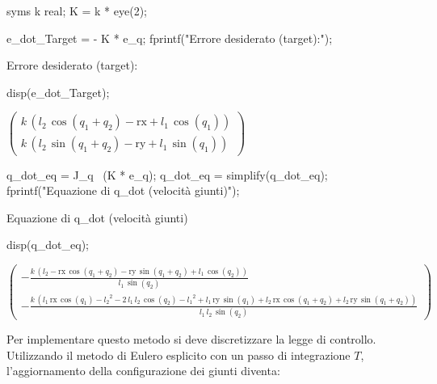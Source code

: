 \documentclass[11pt, a4paper]{article}
\begin{document}
\begin{matlabcode}
syms k real;
K = k * eye(2);

e_dot_Target = - K * e_q;
fprintf("Errore desiderato (target):");
\end{matlabcode}
\begin{matlaboutput}
Errore desiderato (target):
\end{matlaboutput}
\begin{matlabcode}
disp(e_dot_Target);
\end{matlabcode}
\begin{matlabsymbolicoutput}
$\displaystyle \left(\begin{array}{c}
k\,{\left(l_2 \,\cos \left(q_1 +q_2 \right)-\textrm{rx}+l_1 \,\cos \left(q_1 \right)\right)}\\
k\,{\left(l_2 \,\sin \left(q_1 +q_2 \right)-\textrm{ry}+l_1 \,\sin \left(q_1 \right)\right)}
\end{array}\right)$
\end{matlabsymbolicoutput}
\begin{matlabcode}
q_dot_eq = J_q \ (K * e_q);
q_dot_eq = simplify(q_dot_eq);
fprintf("Equazione di q_dot (velocità giunti)");
\end{matlabcode}
\begin{matlaboutput}
Equazione di q_dot (velocità giunti)
\end{matlaboutput}
\begin{matlabcode}
disp(q_dot_eq);
\end{matlabcode}
\begin{matlabsymbolicoutput}
$\displaystyle \left(\begin{array}{c}
-\frac{k\,{\left(l_2 -\textrm{rx}\,\cos \left(q_1 +q_2 \right)-\textrm{ry}\,\sin \left(q_1 +q_2 \right)+l_1 \,\cos \left(q_2 \right)\right)}}{l_1 \,\sin \left(q_2 \right)}\\
-\frac{k\,{\left(l_1 \,\textrm{rx}\,\cos \left(q_1 \right)-{l_2 }^2 -2\,l_1 \,l_2 \,\cos \left(q_2 \right)-{l_1 }^2 +l_1 \,\textrm{ry}\,\sin \left(q_1 \right)+l_2 \,\textrm{rx}\,\cos \left(q_1 +q_2 \right)+l_2 \,\textrm{ry}\,\sin \left(q_1 +q_2 \right)\right)}}{l_1 \,l_2 \,\sin \left(q_2 \right)}
\end{array}\right)$
\end{matlabsymbolicoutput}

\begin{par}
\begin{flushleft}
Per implementare questo metodo si deve discretizzare la legge di controllo. Utilizzando il metodo di Eulero esplicito con un passo di integrazione $T$, l'aggiornamento della configurazione dei giunti diventa:
\end{flushleft}
\end{par}
\end{document}
